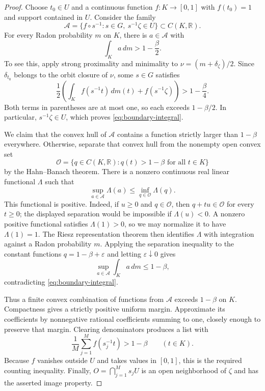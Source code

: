 \documentclass[11pt]{article}
\numberwithin{equation}{section}
\theoremstyle{definition}
\theoremstyle{remark}
\begin{document}
\begin{proof}
Choose $t_0\in U$ and a continuous function $f:K\to[0,1]$ with
$f(t_0)=1$ and support contained in $U$.  Consider the family
\[
 \mathcal A=\{f\circ s^{-1}:s\in G,\ s^{-1}\zeta\in U\}
 \subset C(K,\mathbb R).
\]
For every Radon probability $m$ on $K$, there is $a\in\mathcal A$ with
\begin{equation}\label{eq:boundary-integral}
 \int_K a\,dm>1-\frac{\beta}{2}.
\end{equation}
To see this, apply strong proximality and minimality to
$\nu=(m+\delta_\zeta)/2$.  Since $\delta_{t_0}$ belongs to the orbit
closure of $\nu$, some $s\in G$ satisfies
\[
 \frac12\left(\int_K f(s^{-1}t)\,dm(t)
                      +f(s^{-1}\zeta)\right)>1-\frac{\beta}{4}.
\]
Both terms in parentheses are at most one, so each exceeds
$1-\beta/2$.  In particular, $s^{-1}\zeta\in U$, which proves
\eqref{eq:boundary-integral}.

We claim that the convex hull of $\mathcal A$ contains a function
strictly larger than $1-\beta$ everywhere.  Otherwise, separate that
convex hull from the nonempty open convex set
\[
 \mathcal O=\{q\in C(K,\mathbb R):q(t)>1-\beta\text{ for all }t\in K\}
\]
by the Hahn--Banach theorem.  There is a nonzero continuous real linear
functional $\Lambda$ such that
\[
 \sup_{a\in\mathcal A}\Lambda(a)
 \leq \inf_{q\in\mathcal O}\Lambda(q).
\]
This functional is positive.  Indeed, if $u\geq0$ and $q\in\mathcal O$,
then $q+tu\in\mathcal O$ for every $t\geq0$; the displayed separation
would be impossible if $\Lambda(u)<0$.  A nonzero positive functional
satisfies $\Lambda(1)>0$, so we may normalize it to have
$\Lambda(1)=1$.  The Riesz representation theorem then identifies
$\Lambda$ with integration against a Radon probability $m$.  Applying
the separation inequality to the constant functions
$q=1-\beta+\varepsilon$ and letting $\varepsilon\downarrow0$ gives
\[
 \sup_{a\in\mathcal A}\int_K a\,dm\leq1-\beta,
\]
contradicting \eqref{eq:boundary-integral}.

Thus a finite convex combination of functions from $\mathcal A$
exceeds $1-\beta$ on $K$.  Compactness gives a strictly positive uniform
margin.  Approximate its coefficients by nonnegative rational
coefficients summing to one, closely enough to preserve that margin.
Clearing denominators produces a list with
\[
 \frac1M\sum_{j=1}^M f(s_j^{-1}t)>1-\beta\qquad(t\in K).
\]
Because $f$ vanishes outside $U$ and takes values in $[0,1]$, this is the
required counting inequality.  Finally,
$O=\bigcap_{j=1}^M s_jU$ is an open neighborhood of $\zeta$ and has the
asserted image property.
\end{proof}
\end{document}
